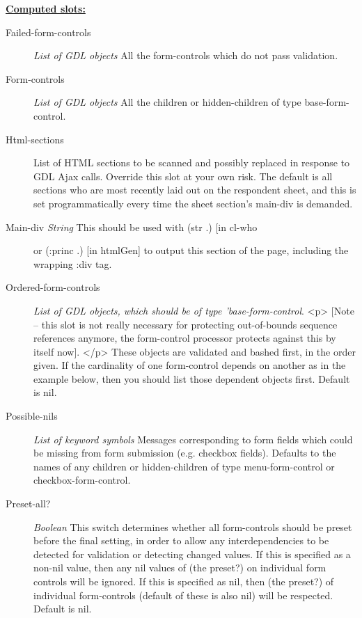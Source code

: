 \documentclass [11pt]{book}
\begin{document}
\begin{itemize}
\textbf{
\underline{Computed slots:}}

\begin{description}

\item [Failed-form-controls]
\emph{List of GDL objects} All the form-controls which do not pass validation.


\item [Form-controls]
\emph{List of GDL objects} All the children or hidden-children
of type base-form-control.


\item [Html-sections]
List of HTML sections to be scanned and possibly replaced in response to
GDL Ajax calls. Override this slot at your own risk. The default is all
sections who are most recently laid out on the respondent sheet, and
this is set programmatically every time the sheet section's main-div
is demanded.


\item [Main-div%
\emph{String} This should be used with (str .) [in cl-who] or (:princ .)
[in htmlGen] to output this section of the page, including the wrapping :div tag.


\item [Ordered-form-controls]
\emph{List of GDL objects, which should be of type 'base-form-control}.
<p>
[Note -- this slot is not really necessary for protecting out-of-bounds sequence references
anymore, the form-control processor protects against this by itself now].
</p>
These objects are validated and bashed first, in the order given. If the cardinality
of one form-control depends on another as in the example below, then you should list
those dependent objects first. Default is nil.


\item [Possible-nils]
\emph{List of keyword symbols} Messages corresponding to form fields which could
be missing from form submission (e.g. checkbox fields). Defaults to the names
of any children or hidden-children of type  menu-form-control or
checkbox-form-control.


\item [Preset-all?]
\emph{Boolean} This switch determines whether all form-controls should be preset
before the final setting, in order to allow any interdependencies to be detected
for validation or detecting changed values. If this is specified as a non-nil
value, then any nil values of (the preset?) on individual form controls will be
ignored. If this is specified as nil, then (the preset?) of individual
form-controls (default of these is also nil) will be respected. Default is nil.



\end{description}
\end{itemize}
\end{document}
